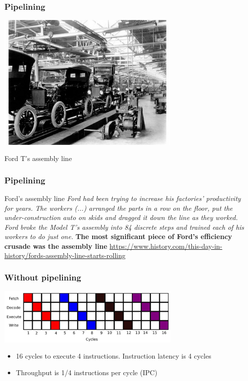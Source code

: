 \begin{frame}[containsverbatim]
\frametitle{Pipelining}
\begin{center}
\includegraphics[width=9cm]{DayGilles/images/ford.jpg}
\end{center}
\vfill
Ford T's assembly line
\end{frame}


\begin{frame}[containsverbatim]
\frametitle{Pipelining}
Ford’s assembly line
\vfill
\textit{Ford had been trying to increase his factories’ productivity for years. The workers (...) arranged the parts in a
row on the floor, put the under-construction auto on skids and dragged it down the line as they worked. Ford
broke the Model T’s assembly into 84 discrete steps and trained each of his workers to do just one.}
\vfill
\textbf{The most significant piece of Ford’s efficiency crusade was the assembly line}
\vfill
{\tiny \url{https://www.history.com/this-day-in-history/fords-assembly-line-starts-rolling}}
\end{frame}


\begin{frame}[containsverbatim]
\frametitle{Without pipelining}
\begin{center}
\includegraphics[width=9cm]{DayGilles/images/pipeline-without.jpg}
\end{center}
\begin{itemize}
\item 16 cycles to execute 4 instructions. Instruction latency is 4 cycles
\item Throughput is 1/4 instructions per cycle (IPC)
\end{itemize}
\end{frame}


